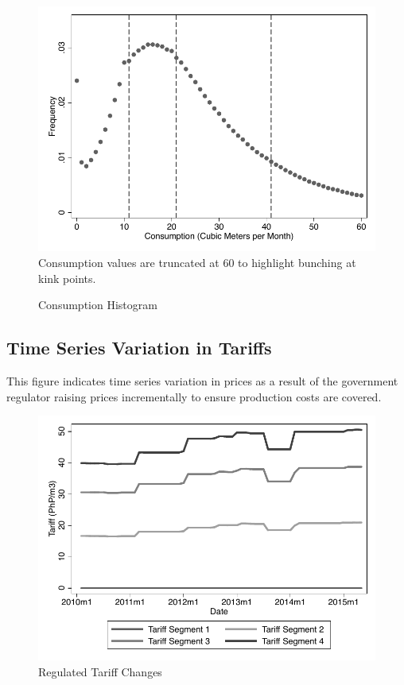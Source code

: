 \documentclass[12pt]{article}
\begin{document}
\begin{appendices}
\begin{figure}
\caption{Consumption Histogram}\label{figure:consumptionhistogram}
\begin{center}
\includegraphics[scale=.7]{tables/consumption_histogram.pdf}\\
\footnotesize{Consumption values are truncated at 60 to highlight bunching at kink points.}
\end{center}
\end{figure}

\subsection{Time Series Variation in Tariffs}\label{appendix:tariffvariation}
This figure indicates time series variation in prices as a result of the government regulator raising prices incrementally to ensure production costs are covered.
\begin{figure}
\caption{Regulated Tariff Changes}\label{figure:regulatedtariffchanges}
\begin{center}
\includegraphics[scale=.7]{tables/tariff_time_series.pdf}
\end{center}
\end{figure}


\end{appendices}
\end{document}
